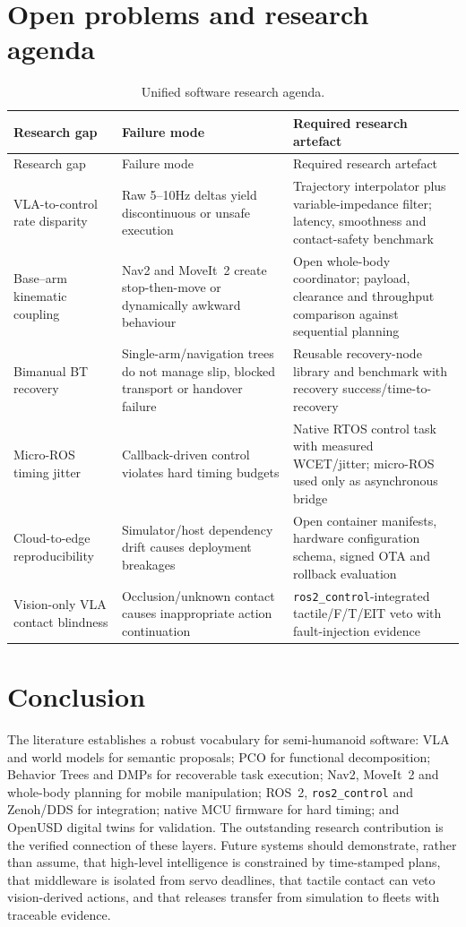 \documentclass[10pt,a4paper]{article}
\begin{document}
\section{Open problems and research agenda}
\begin{longtable}{@{}p{}p{}p{}@{}}
\caption{Unified software research agenda.}\label{tab:gaps}\\
\toprule
Research gap & Failure mode & Required research artefact \\
\midrule
\endfirsthead
\toprule Research gap & Failure mode & Required research artefact \\
\midrule\endhead
VLA-to-control rate disparity & Raw 5--10Hz deltas yield discontinuous or unsafe execution & Trajectory interpolator plus variable-impedance filter; latency, smoothness and contact-safety benchmark \\
Base--arm kinematic coupling & Nav2 and MoveIt~2 create stop-then-move or dynamically awkward behaviour & Open whole-body coordinator; payload, clearance and throughput comparison against sequential planning \\
Bimanual BT recovery & Single-arm/navigation trees do not manage slip, blocked transport or handover failure & Reusable recovery-node library and benchmark with recovery success/time-to-recovery \\
Micro-ROS timing jitter & Callback-driven control violates hard timing budgets & Native RTOS control task with measured WCET/jitter; micro-ROS used only as asynchronous bridge \\
Cloud-to-edge reproducibility & Simulator/host dependency drift causes deployment breakages & Open container manifests, hardware configuration schema, signed OTA and rollback evaluation \\
Vision-only VLA contact blindness & Occlusion/unknown contact causes inappropriate action continuation & \texttt{ros2\_control}-integrated tactile/F/T/EIT veto with fault-injection evidence \\
\bottomrule
\end{longtable}

\section{Conclusion}
The literature establishes a robust vocabulary for semi-humanoid software: VLA and world models for semantic proposals; PCO for functional decomposition; Behavior Trees and DMPs for recoverable task execution; Nav2, MoveIt~2 and whole-body planning for mobile manipulation; ROS~2, \texttt{ros2\_control} and Zenoh/DDS for integration; native MCU firmware for hard timing; and OpenUSD digital twins for validation. The outstanding research contribution is the verified connection of these layers. Future systems should demonstrate, rather than assume, that high-level intelligence is constrained by time-stamped plans, that middleware is isolated from servo deadlines, that tactile contact can veto vision-derived actions, and that releases transfer from simulation to fleets with traceable evidence.
\end{document}
